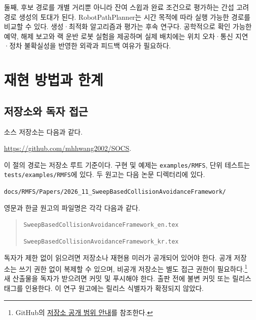 \documentclass[11pt,a4paper]{article}
\theoremstyle{remark}
\begin{document}
둘째, 후보 경로를 개별 거리뿐 아니라 잔여 스윕과 완료 조건으로 평가하는 간섭 고려 경로 생성의 토대가 된다. RobotPathPlanner는 시간 목적에 따라 실행 가능한 경로를 비교할 수 있다. 생성·최적화 알고리즘과 평가는 후속 연구다. 공학적으로 확인 가능한 예약, 해제 보고와 랙 운반 로봇 실험을 제공하며 실제 배치에는 위치 오차·통신 지연·정차 불확실성을 반영한 외곽과 피드백 여유가 필요하다.

\section{재현 방법과 한계}
\label{sec:reproducibility}
\subsection{저장소와 독자 접근}
소스 저장소는 다음과 같다.
\begin{center}
\url{https://github.com/mhhwang2002/SOCS}.
\end{center}
이 절의 경로는 저장소 루트 기준이다. 구현 및 예제는 \nolinkurl{examples/RMFS}, 단위 테스트는 \nolinkurl{tests/examples/RMFS}에 있다. 두 원고는 다음 논문 디렉터리에 있다.\par
\nolinkurl{docs/RMFS/Papers/2026_11_SweepBasedCollisionAvoidanceFramework/}\par
영문과 한글 원고의 파일명은 각각 다음과 같다.
\begin{quote}\small
\nolinkurl{SweepBasedCollisionAvoidanceFramework_en.tex}\par
\nolinkurl{SweepBasedCollisionAvoidanceFramework_kr.tex}
\end{quote}

독자가 제한 없이 읽으려면 저장소나 재현용 미러가 공개되어 있어야 한다. 공개 저장소는 쓰기 권한 없이 복제할 수 있으며, 비공개 저장소는 별도 접근 권한이 필요하다.\footnote{GitHub의 \href{https://docs.github.com/en/repositories/creating-and-managing-repositories/about-repositories}{저장소 공개 범위 안내}를 참조한다.} 새 산출물을 독자가 받으려면 커밋 및 푸시해야 한다. 출판 전에 불변 커밋 또는 릴리스 태그를 인용한다. 이 연구 원고에는 릴리스 식별자가 확정되지 않았다.
\end{document}

